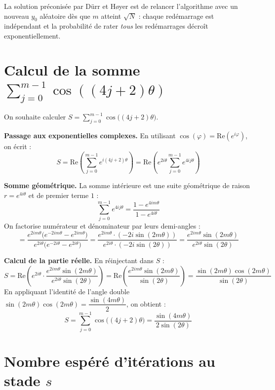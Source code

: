 \documentclass{ceri/sty/rapport}
\begin{document}
La solution préconisée par Dürr et Høyer est de relancer l'algorithme avec un nouveau
$y_0$ aléatoire dès que $m$ atteint $\sqrt{N}$ : chaque redémarrage est indépendant et
la probabilité de rater \emph{tous} les redémarrages décroît exponentiellement.


\newpage

\appendix
\section{Calcul de la somme $\displaystyle\sum_{j=0}^{m-1}\cos((4j+2)\theta)$}
\label{ann:bbht}

On souhaite calculer $S = \displaystyle\sum_{j=0}^{m-1}\cos\!\bigl((4j+2)\theta\bigr)$.

\medskip\noindent\textbf{Passage aux exponentielles complexes.}
En utilisant $\cos(\varphi) = \mathrm{Re}(e^{i\varphi})$, on écrit :
\[
S = \mathrm{Re}\!\left(\sum_{j=0}^{m-1} e^{i(4j+2)\theta}\right)
  = \mathrm{Re}\!\left(e^{2i\theta}\sum_{j=0}^{m-1} e^{4ij\theta}\right)
\]

\medskip\noindent\textbf{Somme géométrique.}
La somme intérieure est une suite géométrique de raison $r = e^{4i\theta}$ et de premier terme $1$ :
\[
\sum_{j=0}^{m-1} e^{4ij\theta}
= \frac{1 - e^{4im\theta}}{1 - e^{4i\theta}}
\]
On factorise numérateur et dénominateur par leurs demi-angles :
\[
= \frac{e^{2im\theta}\bigl(e^{-2im\theta} - e^{2im\theta}\bigr)}{e^{2i\theta}\bigl(e^{-2i\theta} - e^{2i\theta}\bigr)}
= \frac{e^{2im\theta}\cdot(-2i\sin(2m\theta))}{e^{2i\theta}\cdot(-2i\sin(2\theta))}
= \frac{e^{2im\theta}\sin(2m\theta)}{e^{2i\theta}\sin(2\theta)}
\]

\medskip\noindent\textbf{Calcul de la partie réelle.}
En réinjectant dans $S$ :
\[
S = \mathrm{Re}\!\left(e^{2i\theta}\cdot\frac{e^{2im\theta}\sin(2m\theta)}{e^{2i\theta}\sin(2\theta)}\right)
  = \mathrm{Re}\!\left(\frac{e^{2im\theta}\sin(2m\theta)}{\sin(2\theta)}\right)
  = \frac{\sin(2m\theta)\cos(2m\theta)}{\sin(2\theta)}
\]
En appliquant l'identité de l'angle double $\sin(2m\theta)\cos(2m\theta) = \dfrac{\sin(4m\theta)}{2}$, on obtient :
\[
\boxed{S = \sum_{j=0}^{m-1}\cos\!\bigl((4j+2)\theta\bigr) = \frac{\sin(4m\theta)}{2\sin(2\theta)}}
\]

\section{Nombre espéré d'itérations au stade $s$}
\label{ann:esperance}
\end{document}
